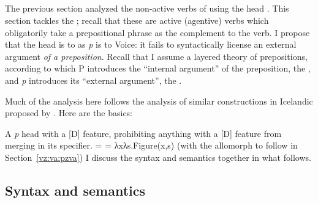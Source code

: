 \begin{exe}
\begin{xlist}
\begin{xlist}
\begin{exe}
\begin{xlist}
\begin{xlist}
\begin{exe}
\begin{xlist}
\begin{xlist}
\begin{exe}
\begin{exe}
\begin{xlist}
\begin{exe}
\begin{exe}
\begin{xlist}
\begin{exe}
\begin{exe}
\begin{exe}
\begin{exe}
\begin{exe}
\begin{xlist}
\begin{exe}
\begin{xlist}
\begin{exe}
\begin{exe}
\begin{xlist}
\begin{exe}
\begin{xlist}
\begin{exe}
\begin{xlist}
\begin{exe}
\begin{exe}
\begin{exe}
\begin{xlist}
\begin{exe}
\begin{exe}
\begin{exe}
\begin{xlist}
\begin{exe}
\begin{xlist}
\begin{exe}
\begin{xlist}
\begin{exe}
\begin{xlist}
\begin{exe}
\begin{exe}
\begin{exe}
\begin{exe}
\begin{xlist}
\begin{exe}
\begin{xlist}
\section{\pz} \label{vz:pz}
The previous section analyzed the non-active verbs of {\tnif} using the head {\vz}. This section tackles the ; recall that these are active (agentive) verbs which obligatorily take a prepositional phrase as the complement to the verb. I propose that the head {\pz} is to {\vz} as \textit{p} is to Voice: it fails to syntactically license an external argument \emph{of a preposition}. Recall that I assume a layered theory of prepositions, according to which P introduces the ``internal argument'' of the preposition, the , and \textit{p} introduces its ``external argument'', the .

Much of the analysis here follows the analysis of similar constructions in Icelandic proposed by \cite{wood15springer}. Here are the basics:
 \begin{exe}
 \ex  \textbf{\pz} 
 \begin{xlist} 
 	\ex  A \textit{p} head with a [\textminus{}D] feature, prohibiting anything with a [D] feature from merging in its specifier. 
     \ex  \denote{\pz} =  = λxλs.Figure(x,s) 
 	\ex  {\pz} {\lra} {\tnif} \hfill (with the allomorph {\thit} to follow in\\
 		\phantom{a} \hfill Section~\ref{vz:va:pzva}) 
 \z
\z 
I discuss the syntax and semantics together in what follows.

	\subsection{Syntax and semantics} \label{vz:pz:syn}	

\end{xlist}
\end{exe}
\end{xlist}
\end{exe}
\end{xlist}
\end{exe}
\end{exe}
\end{exe}
\end{exe}
\end{xlist}
\end{exe}
\end{xlist}
\end{exe}
\end{xlist}
\end{exe}
\end{xlist}
\end{exe}
\end{exe}
\end{exe}
\end{xlist}
\end{exe}
\end{exe}
\end{exe}
\end{xlist}
\end{exe}
\end{xlist}
\end{exe}
\end{xlist}
\end{exe}
\end{exe}
\end{xlist}
\end{exe}
\end{xlist}
\end{exe}
\end{exe}
\end{exe}
\end{exe}
\end{exe}
\end{xlist}
\end{exe}
\end{exe}
\end{xlist}
\end{exe}
\end{exe}
\end{xlist}
\end{xlist}
\end{exe}
\end{xlist}
\end{xlist}
\end{exe}
\end{xlist}
\end{xlist}
\end{exe}
